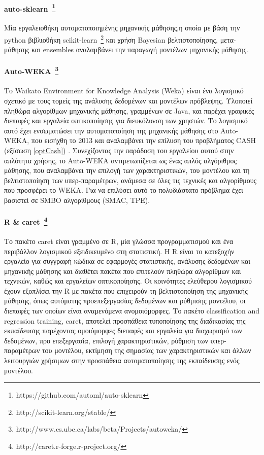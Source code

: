  \paragraph[auto-sklearn]{auto-sklearn~\footnote{https://github.com/automl/auto-sklearn} } Μία εργαλειοθήκη αυτοματοποιημένης μηχανικής μάθησης,η οποία με βάση την python βιβλιοθήκη scikit-learn~\footnote{http://scikit-learn.org/stable/} και χρήση Bayesian βελτιστοποίησης, μετα-μάθησης και ensembles αναλαμβάνει την παραγωγή μοντέλων μηχανικής μάθησης.
 
    
 \paragraph[Auto-WEKA]{Auto-WEKA~\footnote{http://www.cs.ubc.ca/labs/beta/Projects/autoweka/} }  Το Waikato Environment for Knowledge Analysis (Weka) είναι ένα λογισμικό σχετικό με τους τομείς της ανάλυσης δεδομένων και μοντέλων πρόβλεψης. Υλοποιεί πληθώρα αλγορίθμων μηχανικής μάθησης, γραμμένων σε Java, και παρέχει γραφικές διεπαφές και εργαλεία οπτικοποίησης για διευκόλυνση των χρηστών. Το λογισμικό αυτό έχει ενσωματώσει την αυτοματοποίηση της μηχανικής μάθησης στο Auto-WEKA, που εισήχθη το 2013 \citep{DBLP:journals/corr/abs-1208-3719} και αναλαμβάνει την επίλυση του προβλήματος  CASH (εξίσωση \ref{optCash}) . Συνεχίζοντας την παράδοση του εργαλείου αυτού στην απλότητα χρήσης, το Auto-WEKA αντιμετωπίζεται ως ένας απλός αλγόριθμος μάθησης, που αναλαμβάνει την επιλογή των χαρακτηριστικών, του μοντέλου και  τη βελτιστοποίηση των υπερ-παραμέτρων, ανάμεσα σε όλες τις τεχνικές και αλγορίθμους που προσφέρει το WEKA. Για να επιλύσει αυτό το πολυδιάστατο πρόβλημα έχει βασιστεί σε SMBO αλγορίθμους (SMAC, TPE).  
 \paragraph[caret]{R \& caret~\footnote{http://caret.r-forge.r-project.org/} }  Το πακέτο caret είναι γραμμένο σε R, μία γλώσσα προγραμματισμού και ένα περιβάλλον λογισμικού εξειδικευμένο στη στατιστική. Η R είναι το κατεξοχήν εργαλείο για συγγραφή κώδικα σε εφαρμογές στατιστικής, ανάλυσης δεδομένων και μηχανικής μάθησης και  διαθέτει πακέτα που επιτελούν πληθώρα αλγορίθμων και τεχνικών, καθώς και εργαλείων οπτικοποίησης. Οι κοινότητες ελεύθερου λογισμικού έχουν εξοπλίσει την R με πακέτα που επιχειρούν τη βελτιστοποίηση της μηχανικής μάθησης, όπως αυτόματης προεπεξεργασίας δεδομένων και  ρύθμισης μοντέλου, οι διεπαφές των οποίων είναι αναμενόμενα ανομοιόμορφες.  Το πακέτο classification and regression training, caret, αποτελεί προσπάθεια τυποποίησης της διαδικασίας της εκπαίδευσης παρέχοντας ομοιόμορφες διεπαφές και  εργαλεία για διαχωρισμό των δεδομένων, προ επεξεργασία, επιλογή χαρακτηριστικών, ρύθμιση των υπερ-παραμέτρων του μοντέλου, εκτίμηση της σημασίας των χαρακτηριστικών και άλλων λειτουργιών χρήσιμων στην προσπάθεια αυτοματοποίησης της εκπαίδευσης ενός μοντέλου.
